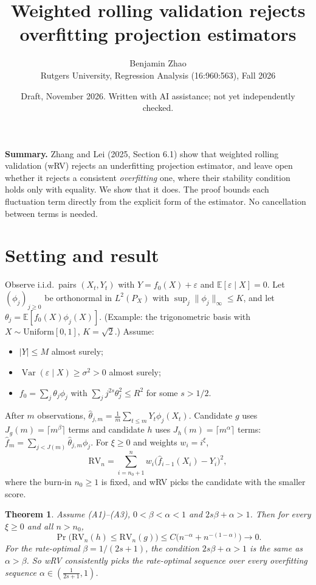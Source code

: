 \documentclass[11pt]{article}
\title{Weighted rolling validation rejects overfitting projection estimators}
\author{Benjamin Zhao\\{\small Rutgers University, Regression Analysis (16:960:563), Fall 2026}}
\date{{\small Draft, November 2026. Written with AI assistance; not yet independently checked.}}
\newtheorem{theorem}{Theorem}
\newcommand{\E}{\mathbb{E}}
\newcommand{\Var}{\operatorname{Var}}
\newcommand{\RV}{\mathrm{RV}}
\begin{document}
\maketitle

\noindent\textbf{Summary.} Zhang and Lei (2025, Section 6.1) show that weighted rolling validation (wRV) rejects an underfitting projection estimator, and leave open whether it rejects a consistent \emph{overfitting} one, where their stability condition holds only with equality. We show that it does. The proof bounds each fluctuation term directly from the explicit form of the estimator. No cancellation between terms is needed.

\section{Setting and result}

Observe i.i.d.\ pairs $(X_t,Y_t)$ with $Y=f_0(X)+\varepsilon$ and $\E[\varepsilon\mid X]=0$. Let $(\phi_j)_{j\ge0}$ be orthonormal in $L^2(P_X)$ with $\sup_j\|\phi_j\|_\infty\le K$, and let $\theta_j=\E[f_0(X)\phi_j(X)]$. (Example: the trigonometric basis with $X\sim\mathrm{Uniform}[0,1]$, $K=\sqrt2$.) Assume:
\begin{itemize}\itemsep0pt
\item[(A1)] $|Y|\le M$ almost surely;
\item[(A2)] $\Var(\varepsilon\mid X)\ge\sigma^2>0$ almost surely;
\item[(A3)] $f_0=\sum_j\theta_j\phi_j$ with $\sum_j j^{2s}\theta_j^2\le R^2$ for some $s>1/2$.
\end{itemize}
After $m$ observations, $\hat\theta_{j,m}=\frac1m\sum_{t\le m}Y_t\phi_j(X_t)$. Candidate $g$ uses $J_g(m)=\lceil m^\beta\rceil$ terms and candidate $h$ uses $J_h(m)=\lceil m^\alpha\rceil$ terms: $\hat f_m=\sum_{j<J(m)}\hat\theta_{j,m}\phi_j$. For $\xi\ge0$ and weights $w_i=i^\xi$,
\[
\RV_n=\sum_{i=n_0+1}^n w_i\bigl(\hat f_{i-1}(X_i)-Y_i\bigr)^2 ,
\]
where the burn-in $n_0\ge1$ is fixed, and wRV picks the candidate with the smaller score.

\begin{theorem}
Assume (A1)--(A3), $0<\beta<\alpha<1$ and $2s\beta+\alpha>1$. Then for every $\xi\ge0$ and all $n>n_0$,
\[
\Pr\bigl(\RV_n(h)\le\RV_n(g)\bigr)\le C\bigl(n^{-\alpha}+n^{-(1-\alpha)}\bigr)\to0 .
\]
For the rate-optimal $\beta=1/(2s+1)$, the condition $2s\beta+\alpha>1$ is the same as $\alpha>\beta$. So wRV consistently picks the rate-optimal sequence over every overfitting sequence $\alpha\in(\tfrac1{2s+1},1)$.
\end{theorem}
\end{document}
